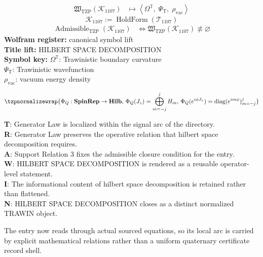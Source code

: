 \noindent
\begin{minipage}[t]{0.48\linewidth}
\begingroup
\small
\[
\begin{aligned}
\mathfrak{W}_{\mathrm{TZP}}\!\left(\mathcal{K}_{1107}\right)
&\longmapsto
\left\langle \Omega^{\mathbb{T}},\; \Psi_{\mathrm{T}},\; \rho_{\mathrm{vac}} \right\rangle
\end{aligned}
\]
\[
\mathcal{K}_{1107}
:=
\operatorname{HoldForm}\!\left(\mathcal{T}_{1107}\right)
\]
\[
\begin{aligned}
\operatorname{Admissible}_{\mathrm{TZP}}\!\left(\mathcal{K}_{1107}\right)
&\Longleftrightarrow
\mathfrak{W}_{\mathrm{TZP}}\!\left(\mathcal{K}_{1107}\right)\not\equiv\varnothing
\end{aligned}
\]
\textbf{Wolfram register:} canonical symbol lift\\
\textbf{Title lift:} HILBERT SPACE DECOMPOSITION\\
\textbf{Symbol key:} \(\Omega^{\mathbb{T}}\): Trawinistic boundary curvature\\ \(\Psi_{\mathrm{T}}\): Trawinistic wavefunction\\ \(\rho_{\mathrm{vac}}\): vacuum energy density
\par
\endgroup
\end{minipage}\hfill
\begin{minipage}[t]{0.48\linewidth}
\[
\tzpnormalizewrap{\Phi_Q:\mathbf{SpinRep}\to\mathbf{Hilb},\,\Phi_Q(J_z)=\bigoplus_{m=-j}^{j}H_m,\,\Phi_Q(e^{i\phi J_z})=\operatorname{diag}(e^{im\phi})_{m=-j}^{j}}
\]

\small
\textbf{T}: Generator Law is localized within the signal arc of the directory.\\
\textbf{R}: Generator Law preserves the operative relation that hilbert space decomposition requires.\\
\textbf{A}: Support Relation 3 fixes the admissible closure condition for the entry.\\
\textbf{W}: HILBERT SPACE DECOMPOSITION is rendered as a reusable operator-level statement.\\
\textbf{I}: The informational content of hilbert space decomposition is retained rather than flattened.\\
\textbf{N}: HILBERT SPACE DECOMPOSITION closes as a distinct normalized TRAWIN object.
\normalsize
\end{minipage}

The entry now reads through actual sourced equations, so its local arc is carried by explicit mathematical relations rather than a uniform quaternary certificate record shell.
\clearpage

